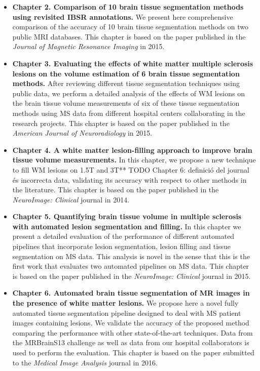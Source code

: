 \begin{itemize}
\item \textbf{Chapter 2. Comparison of 10 brain tissue segmentation methods using revisited IBSR annotations.}  We present here comprehensive comparison of the accuracy of 10 brain tissue segmentation methods on two public MRI databases. This chapter is based on the paper published in  the\textit{ Journal of Magnetic Resonance Imaging} in 2015. 

\item \textbf{Chapter 3. Evaluating the effects of white matter multiple sclerosis lesions on the volume estimation of 6 brain tissue segmentation methods.} After reviewing different tissue segmentation techniques using public data, we perform a detailed analysis of the effects of WM lesions on the brain tissue volume measurements of six of these tissue segmentation methods using MS data from different hospital centers collaborating in the research projects. This chapter is based on the paper published in  the \textit{American Journal of Neuroradiology} in 2015. 

\item \textbf{Chapter 4. A white matter lesion-filling approach to improve brain tissue volume measurements.} In this chapter, we propose a new technique to fill WM lesions on 1.5T and 3T** TODO Chapter 6: definició del journal és incorrecta
 data, validating its accuracy with respect to other methods in the literature. This chapter is based on the paper published in the \textit{NeuroImage: Clinical} journal in 2014. 

\item \textbf{Chapter 5. Quantifying brain tissue volume in multiple sclerosis with automated lesion segmentation and filling.} In this chapter we present a detailed  evaluation of the performance of different automated pipelines that incorporate lesion segmentation, lesion filling and tissue segmentation on MS data. This analysis is novel in the sense that this is the first work that evaluates two automated pipelines on MS data. This chapter is based on the paper published in the \textit{NeuroImage: Clinical} journal in 2015.

\item \textbf{Chapter 6. Automated brain tissue segmentation of MR images in the presence of white matter lesions.} We propose here a novel fully automated tissue segmentation pipeline designed to deal with MS patient images containing lesions. We validate the accuracy of the proposed method comparing the performance with other state-of-the-art techniques. Data from the MRBrainS13 challenge as well as data from our hospital collaborators is used to perform the evaluation. This chapter is based on the paper submitted to the \textit{Medical Image Analysis} journal in 2016.  


\end{itemize}
